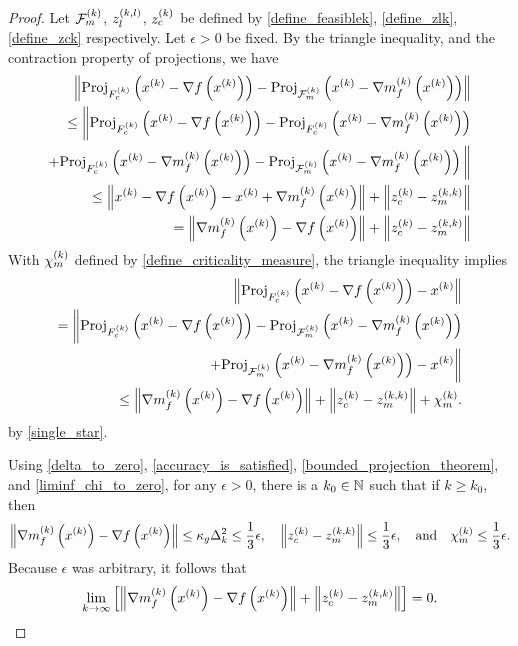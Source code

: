 \begin{proof}

Let 
${\mathcal F_m^{(k)}}$, ${z_l^{(k, l)}}$, ${z_c^{(k)}}$
be defined by 
\cref{define_feasiblek}, \cref{define_zlk}, \cref{define_zck}
respectively.
Let $\epsilon > 0$ be fixed.
By the triangle inequality, and the contraction property of projections, we have
\begin{align}\left \|
 {\textrm{Proj}}_{{F_c^{(k)}}}\left(x^{(k)} - \nabla f\left(x^{(k)}\right)\right)
-{\textrm{Proj}}_{{\mathcal F_m^{(k)}}}\left(x^{(k)} - {\nabla m_f^{(k)}\left(x^{(k)}\right)} \right)
\right\| \nonumber \\
\le 
\bigg \|
 {\textrm{Proj}}_{{F_c^{(k)}}}\left(x^{(k)} - \nabla f\left(x^{(k)}\right)\right) 
-{\textrm{Proj}}_{{F_c^{(k)}}}\left(x^{(k)} - {\nabla m_f^{(k)}\left(x^{(k)}\right)} \right) \nonumber \\
+{\textrm{Proj}}_{{F_c^{(k)}}}\left(x^{(k)} - {\nabla m_f^{(k)}\left(x^{(k)}\right)} \right)
-{\textrm{Proj}}_{{\mathcal F_m^{(k)}}}\left(x^{(k)} - {\nabla m_f^{(k)}\left(x^{(k)}\right)} \right)
\bigg\| \nonumber \\
\le \left\|
x^{(k)} - \nabla f\left(x^{(k)}\right) - x^{(k)} + {\nabla m_f^{(k)}\left(x^{(k)}\right)}
\right\| + \left\|{z_c^{(k)}} - {z_m^{(k, k)}}\right\| \nonumber \\
= \left\|{\nabla m_f^{(k)}\left(x^{(k)}\right)} - \nabla f\left(x^{(k)}\right)\right\| + \left\|{z_c^{(k)}} - {z_m^{(k, k)}}\right\| \label{single_star}
\end{align}
With ${\chi_m^{(k)}}$ defined by \cref{define_criticality_measure}, the triangle inequality implies
\begin{align*}
\left\|{\textrm{Proj}}_{{F_c^{(k)}}}\left(x^{(k)} - \nabla f\left(x^{(k)}\right)\right) - x^{(k)} \right\| \\
= \bigg\|
 {\textrm{Proj}}_{{F_c^{(k)}}}\left(x^{(k)} - \nabla f\left(x^{(k)}\right)\right)
-{\textrm{Proj}}_{{\mathcal F_m^{(k)}}}\left(x^{(k)} - {\nabla m_f^{(k)}\left(x^{(k)}\right)} \right) \\
+{\textrm{Proj}}_{{\mathcal F_m^{(k)}}}\left(x^{(k)} - {\nabla m_f^{(k)}\left(x^{(k)}\right)} \right)
- x^{(k)}\bigg\| \\
\le \left\|{\nabla m_f^{(k)}\left(x^{(k)}\right)} - \nabla f\left(x^{(k)}\right)\right\| + \left\|{z_c^{(k)}} - {z_m^{(k, k)}}\right\| + {\chi_m^{(k)}}.
\end{align*}
by \cref{single_star}.


Using \cref{delta_to_zero}, \cref{accuracy_is_satisfied}, \cref{bounded_projection_theorem}, and \cref{liminf_chi_to_zero},
for any $\epsilon > 0$, there is a $k_0 \in \mathbb N$ such that if $k \ge k_0$, then
\begin{align*}
\left\|{\nabla m_f^{(k)}\left(x^{(k)}\right)} - \nabla f\left(x^{(k)}\right)\right\| \le \kappa_g \Delta_k^2 \le \frac 1 3 \epsilon,
\quad
\left\|{z_c^{(k)}} - {z_m^{(k, k)}}\right\| \le \frac 1 3 \epsilon,
\quad \textrm{and} \quad
{\chi_m^{(k)}} \le \frac 1 3 \epsilon.
\end{align*}
Because $\epsilon$ was arbitrary, it follows that
\begin{align*}
\lim_{k\to\infty} \left[\left\|{\nabla m_f^{(k)}\left(x^{(k)}\right)} - \nabla f\left(x^{(k)}\right)\right\| + \left\|{z_c^{(k)}} - {z_m^{(k, k)}}\right\|\right] = 0.
\end{align*}
\end{proof}

